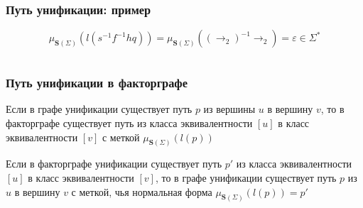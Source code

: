 \documentclass{beamer}
\begin{document}
\begin{frame}[fragile]
  \frametitle{Путь унификации: пример}
  \vspace{-0.5cm}
  \[
    \mu_{\bm{S}(\Sigma)}(l(s^{-1}f^{-1}hq)) = \mu_{\bm{S}(\Sigma)}((\to_2)^{-1} \to_2) = \varepsilon \in \Sigma^*
  \]
  \vspace{-1cm}
  \begin{columns}
    \begin{column}{0.3\textwidth}
      
    \end{column}
    \begin{column}{0.7\textwidth}
      \begin{center}
        
      \end{center}
    \end{column}
    \end{columns}
\end{frame}

\begin{frame}[fragile]
  \frametitle{Путь унификации в факторграфе}

\begin{theorem}
  Если в графе унификации существует путь $p$ из вершины $u$ в вершину $v$, то в факторграфе существует путь из класса эквивалентности $[u]$ в класс эквивалентности $[v]$ с меткой $\mu_{\bm{S}(\Sigma)}(l(p))$
\end{theorem}


\begin{theorem}
  Если в факторграфе унификации существует путь $p'$ из класса эквивалентности $[u]$ в класс эквивалентности $[v]$, то в графе унификации существует путь $p$ из $u$ в вершину $v$ с меткой, чья нормальная форма $\mu_{\bm{S}(\Sigma)}(l(p)) = p'$
\end{theorem}


\begin{center}
\end{center}

\end{frame}
\end{document}
